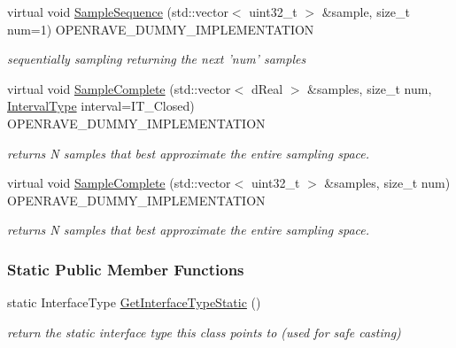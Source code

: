 \begin{DoxyCompactItemize}
virtual void \hyperlink{classOpenRAVE_1_1SpaceSamplerBase_a34363c72ec66a1249f4c94000d15fd7b}{SampleSequence} (std::vector$<$ uint32\_\-t $>$ \&sample, size\_\-t num=1) OPENRAVE\_\-DUMMY\_\-IMPLEMENTATION
\begin{DoxyCompactList}\small\item\em sequentially sampling returning the next 'num' samples \item\end{DoxyCompactList}\item 
virtual void \hyperlink{classOpenRAVE_1_1SpaceSamplerBase_a090abc1c115a60100fc8ed5c85a5ebc2}{SampleComplete} (std::vector$<$ dReal $>$ \&samples, size\_\-t num, \hyperlink{namespaceOpenRAVE_a0d04dbfb6240509e26f8336ab1756937}{IntervalType} interval=IT\_\-Closed) OPENRAVE\_\-DUMMY\_\-IMPLEMENTATION
\begin{DoxyCompactList}\small\item\em returns N samples that best approximate the entire sampling space. \item\end{DoxyCompactList}\item 
virtual void \hyperlink{classOpenRAVE_1_1SpaceSamplerBase_a996ca169f30d50c4b58f7dd249d312c9}{SampleComplete} (std::vector$<$ uint32\_\-t $>$ \&samples, size\_\-t num) OPENRAVE\_\-DUMMY\_\-IMPLEMENTATION
\begin{DoxyCompactList}\small\item\em returns N samples that best approximate the entire sampling space. \item\end{DoxyCompactList}\end{DoxyCompactItemize}
\subsubsection*{Static Public Member Functions}
\begin{DoxyCompactItemize}
\item 
\hypertarget{classOpenRAVE_1_1SpaceSamplerBase_affeafe65e7c4094f282d273dedbf069b}{
static InterfaceType \hyperlink{classOpenRAVE_1_1SpaceSamplerBase_affeafe65e7c4094f282d273dedbf069b}{GetInterfaceTypeStatic} ()}
\label{classOpenRAVE_1_1SpaceSamplerBase_affeafe65e7c4094f282d273dedbf069b}

\begin{DoxyCompactList}\small\item\em return the static interface type this class points to (used for safe casting) \item\end{DoxyCompactList}\end{DoxyCompactItemize}


